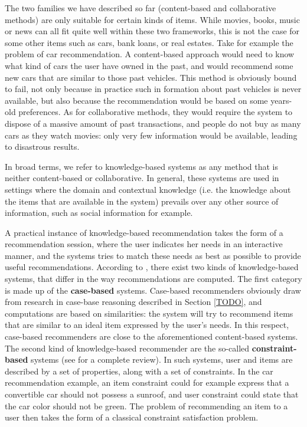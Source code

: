 The two families we have described so far (content-based and collaborative
methods) are only suitable for certain kinds of items. While movies, books,
music or news can all fit quite well within these two frameworks, this is not
the case for some other items such as cars, bank loans, or real estates. Take
for example the problem of car recommendation. A content-based approach would
need to know what kind of cars the user have owned in the past, and would
recommend some new cars that are similar to those past vehicles. This method is
obviously bound to fail, not only because in practice such in formation about
past vehicles is never available, but also because the recommendation would be
based on some years-old preferences. As for collaborative methods, they would
require the system to dispose of a massive amount of past transactions, and
people do not buy as many cars as they watch movies: only very few information
would be available, leading to disastrous results.

In broad terms, we refer to knowledge-based systems as any method that is
neither content-based or collaborative. In general, these systems are used in
settings where the domain and contextual knowledge (i.e. the knowledge about the
items that are available in the system) prevails over any other source of
information, such as social information for example.

A practical instance of  knowledge-based recommendation takes the form of a
recommendation session, where the user indicates her needs in an interactive
manner, and the systems tries to match these needs as best as possible to
provide useful recommendations. According to \cite{FelBur08}, there exist two
kinds of knowledge-based systems, that differ in the way recommendations are
computed. The first category is made up of the \textbf{case-based} systems.
Case-based recommenders obviously draw from research in case-base reasoning
described in Section \ref{TODO}, and computations are based on similarities:
the system will try to recommend items that are similar to an ideal item
expressed by the user's needs. In
this respect, case-based recommenders are close to the aforementioned
content-based systems. The second  kind of knowledge-based recommender are the
so-called \textbf{constraint-based} systems (see \cite{FelFriJanZan11} for a complete
review). In such systems, user and items are described
by a set of properties, along with a set of constraints. In the car
recommendation example, an item constraint could for example express that a
convertible car should not possess a sunroof, and user constraint could state
that the car color should not be green. The problem of recommending an item to
a user then takes the form of a classical constraint satisfaction
problem.

